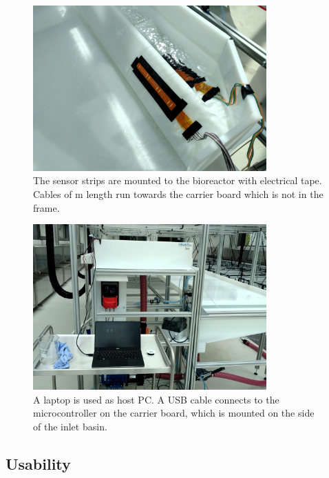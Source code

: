 \begin{figure}[H]
	\begin{center}
		\includegraphics[width=0.8\textwidth]{images/stripsinreactor.jpg} 
		\caption{The sensor strips are mounted to the bioreactor with electrical tape. Cables of \unit[1]{m} length run towards the carrier board which is not in the frame.}
	\label{fig:stripsr}
	\end{center}
\end{figure}

\begin{figure}[H]
	\begin{center}
		\includegraphics[width=0.8\textwidth]{images/pconreactor.jpg} 
		\caption{A laptop is used as host PC. A USB cable connects to the microcontroller on the carrier board, which is mounted on the side of the inlet basin.}
	\label{fig:pcr}
	\end{center}
\end{figure}

\subsection{Usability}


